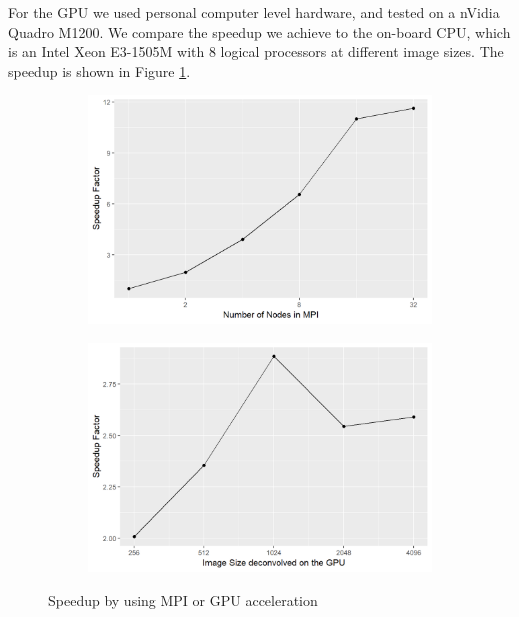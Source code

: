 For the GPU we used personal computer level hardware, and tested on a nVidia Quadro M1200. We compare the speedup we achieve to the on-board CPU, which is an Intel Xeon E3-1505M with 8 logical processors at different image sizes. The speedup is shown in Figure \ref{results:speedup:figure}.

\begin{figure}[h]
	\centering
	\begin{subfigure}[b]{0.45\linewidth}
		\includegraphics[width=1.00\linewidth]{./chapters/10.results/speedup/dist-speedup.png}
	\end{subfigure}
	\begin{subfigure}[b]{0.45\linewidth}
		\includegraphics[width=1.00\linewidth]{./chapters/10.results/speedup/gpu.png}
	\end{subfigure}
	\caption{Speedup by using MPI or GPU acceleration}
	\label{results:speedup:figure}
\end{figure}

